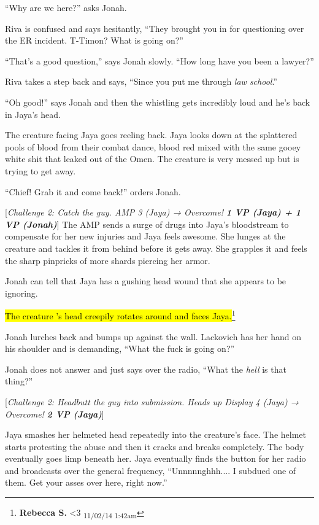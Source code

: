 ``Why are we here?'' asks Jonah.

Riva is confused and says hesitantly, ``They brought you in for questioning over the ER incident.  T-Timon?  What is going on?''

``That's a good question,'' says Jonah slowly.  ``How long have you been a lawyer?''

Riva takes a step back and says, ``Since you put me through \textit{law school}.''

``Oh good!'' says Jonah and then the whistling gets incredibly loud and he's back in Jaya's head.



The creature facing Jaya goes reeling back.  Jaya looks down at the splattered pools of blood from their combat dance, blood red mixed with the same gooey white shit that leaked out of the Omen.  The creature is very messed up but is trying to get away.

``Chief!  Grab it and come back!'' orders Jonah.

{[}\textit{Challenge 2: Catch the guy.  AMP 3 (Jaya) → Overcome! }\textit{\textbf{1 VP (Jaya) + 1 VP (Jonah)}}{]}  The AMP sends a surge of drugs into Jaya's bloodstream to compensate for her new injuries and Jaya feels awesome.  She lunges at the creature and tackles it from behind before it gets away.   She grapples it and feels the sharp pinpricks of more shards piercing her armor.  

Jonah can tell that Jaya has a gushing head wound that she appears to be ignoring.

\hl{The creature 's head creepily rotates around and faces Jaya.}\footnote{\textbf{Rebecca S. }\textless 3 \textsubscript{11/02/14 1:42am}}

Jonah lurches back and bumps up against the wall.  Lackovich has her hand on his shoulder and is demanding, ``What the fuck is going on?''

Jonah does not answer and just says over the radio, ``What the \textit{hell} is that thing?''

{[}\textit{Challenge 2: Headbutt the guy into submission.  Heads up Display 4 (Jaya) → Overcome! }\textit{\textbf{2 VP (Jaya)}}{]}

Jaya smashes her helmeted head repeatedly into the creature's face.  The helmet starts protesting the abuse and then it cracks and breaks completely. The body eventually goes limp beneath her.  Jaya eventually finds the button for her radio and broadcasts over the general frequency, ``Unnnnnghhh.... I subdued one of them.  Get your asses over here, right now.''

